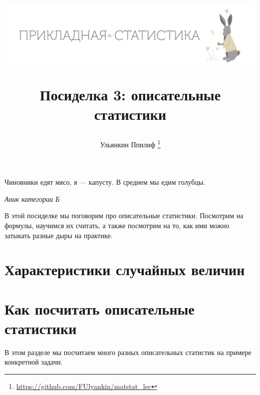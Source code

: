 \documentclass[12pt, a4paper, oneside]{article}
\title{
\begin{center} 
\includegraphics[width=0.99\textwidth]{logo.png}
\end{center}

Посиделка 3: описательные статистики}
\date{ } %
\author{Ульянкин Ппилиф \thanks{\url{https://github.com/FUlyankin/matstat_lec}}}
\begin{document}

\maketitle

\epigraph{Чиновники едят мясо, я — капусту. В среднем мы едим голубцы.}{\textit{Аник категории Б}}

В этой посиделке мы поговорим про описательные статистики. Посмотрим на формулы, научимся их считать, а также посмотрим на то, как ими можно затыкать разные дыры на практике. 

\section{Характеристики случайных величин} 







\section{Как посчитать описательные статистики}

В этом разделе мы посчитаем много разных описательных статистик на примере конкретной задачи. 
\end{document}
